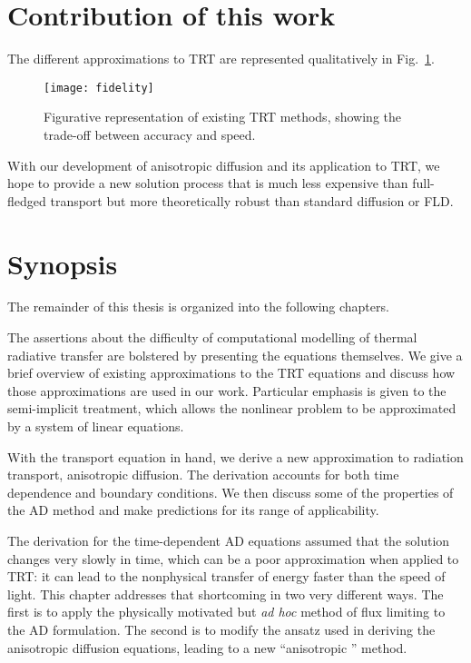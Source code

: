 \section{Contribution of this work}

The different approximations to TRT are represented qualitatively in
Fig.~\ref{fig:fidelity}.

\begin{figure}[htb]
  \centering
  \texttt{[image: fidelity]}
  \caption{Figurative representation of existing TRT methods, showing the
  trade-off between accuracy and speed.}
  \label{fig:fidelity}
\end{figure}

With our development of anisotropic diffusion and its application to TRT, we
hope to provide a new solution process that is much less expensive than
full-fledged transport but more theoretically robust than standard diffusion or
FLD.

\section{Synopsis}

The remainder of this thesis is organized into the following chapters.

The assertions about the difficulty of computational modelling of thermal
radiative transfer are bolstered by presenting the equations themselves. We give
a brief overview of existing approximations to the TRT equations and discuss how
those approximations are used in our work. Particular emphasis is given to the
semi-implicit treatment, which allows the nonlinear problem to be approximated
by a system of linear equations.

With the transport equation in hand, we derive a new approximation to radiation
transport, anisotropic diffusion. The derivation accounts for both time
dependence and boundary conditions. We then discuss some of the properties of
the AD method and make predictions for its range of applicability.

The derivation for the time-dependent AD equations assumed that the solution
changes very slowly in time, which can be a poor approximation when applied to
TRT: it can lead to the nonphysical transfer of energy faster than the speed of
light. This chapter addresses that shortcoming in two very different ways. The
first is to apply the physically motivated but \emph{ad hoc} method of flux
limiting to the AD formulation. The second is to modify the ansatz used in
deriving the anisotropic diffusion equations, leading to a new ``anisotropic
\Pone'' method.

